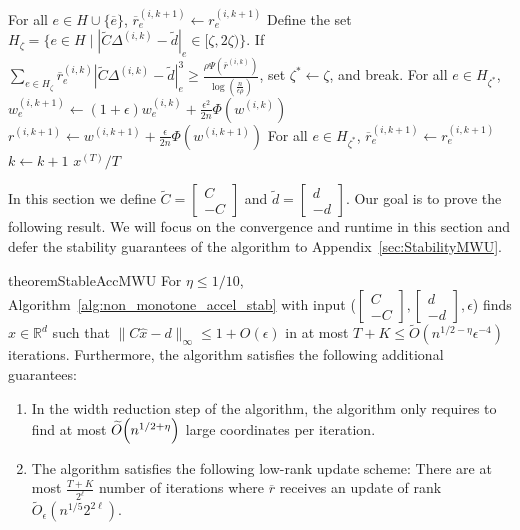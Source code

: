 \documentclass[11pt]{article}
\let\originalleft\left
\let\originalright\right
\renewcommand{\left}{\mathopen{}\mathclose\bgroup\originalleft}
\renewcommand{\right}{\aftergroup\egroup\originalright}
\newcommand\dd{\boldsymbol{\mathit{d}}}
\newcommand\rr{\boldsymbol{\mathit{r}}}
\newcommand\ww{\boldsymbol{\mathit{w}}}
\newcommand\xx{\boldsymbol{\mathit{x}}}
\newcommand\CC{\boldsymbol{\mathit{C}}}
\newcommand\xxhat{\widehat{\xx}}
\newcommand\Otil{\widetilde{O}}
\newcommand{\wt}{\widetilde}
\newcommand{\ov}{\overline}
\begin{document}
\begin{algorithm}
\begin{algorithmic}[1]
\State For all $e\in H \cup \{\ov{e}\} $, $\ov{\rr}_e^{(i,k+1)} \gets \rr_e^{(i,k+1)}$ \label{algline:width_update_rrbar_H_neq_S}
\Else
{} \State {}
\State Define the set $H_\zeta = \{e \in H \mid |\wt{\CC} \Delta^{(i,k)} - \wt{\dd}|_e \in [\zeta, 2 \zeta)\}$.
\State If $\sum_{e \in H_{\zeta}} \ov{\rr}^{(i,k)}_e |\wt{\CC} \Delta^{(i,k)} - \wt{\dd}|_e^3 \geq \frac{\rho \Psi(\ov{\rr}^{(i,k)})}{\log (\frac{n}{\epsilon \rho})}$, set $\zeta^* \gets \zeta$, and break.\label{algline:zeta*}
\EndFor
\State For all $e \in H_{\zeta^*}$, $\ww_e^{(i,k+1)}\gets (1+\epsilon)\ww_e^{(i,k)} + \frac{\epsilon^2}{2n}\Phi(\ww^{(i,k)})$\label{algline:update_e_in_zeta*}
\State $\rr^{(i,k+1)}\gets \ww^{(i,k+1)} + \frac{\epsilon}{2n}\Phi(\ww^{(i,k+1)})$
\State For all $e\in H_{\zeta^*}$, $\ov{\rr}_e^{(i,k+1)} \gets \rr_e^{(i,k+1)}$ \label{algline:width_update_rrbar_H_eq_S}
\EndIf
\State $k \gets k+1$
\EndIf
\EndWhile
\State \Return $\xx^{(T)}/T$
\EndProcedure
\end{algorithmic}
\end{algorithm}


In this section we define $\wt{\CC} = \begin{bmatrix}
    \CC\\ -\CC
\end{bmatrix}$ and $\wt{\dd} = \begin{bmatrix}
    \dd\\ -\dd
\end{bmatrix}$. Our goal is to prove the following result. We will focus on the convergence and runtime in this section and defer the stability guarantees of the algorithm to Appendix~\ref{sec:StabilityMWU}.

\begin{restatable}{theorem}{StableAccMWU}\label{thm:StableAccMWU}
For $\eta\leq 1/10$, Algorithm~\ref{alg:non_monotone_accel_stab} with input ($\begin{bmatrix}
    \CC\\ -\CC
\end{bmatrix}, \begin{bmatrix}
    \dd\\ -\dd
\end{bmatrix}, \epsilon$) finds $\xxhat\in \mathbb{R}^d$ such that $\|\CC\xxhat-\dd\|_{\infty} \leq 1+O(\epsilon)$ in at most $T + K \leq \Otil(n^{1/2-\eta}\epsilon^{-4})$ iterations. Furthermore, the algorithm satisfies the following additional guarantees:
\begin{enumerate}
    \item In the width reduction step of the algorithm, the algorithm only requires to find at most $\Otil\left(n^{1/2+\eta}\right)$ large coordinates per iteration.
    \item The algorithm satisfies the following low-rank update scheme: There are at most $\frac{T+K}{2^{\ell}}$ number of iterations where $\ov{\rr}$ receives an update of rank $\Otil_{\epsilon}(n^{1/5} 2^{2 \ell})$.
\end{enumerate}
\end{restatable}
\end{document}
